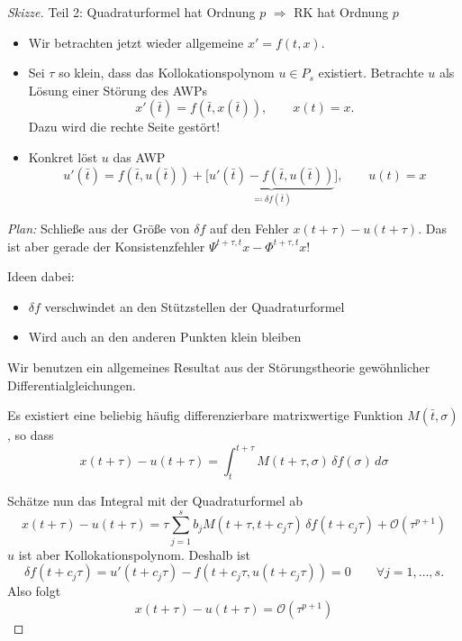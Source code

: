\begin{proof}[Skizze]
	Teil 2: Quadraturformel hat Ordnung $p$ $\Rightarrow$ RK hat Ordnung $p$
	\begin{itemize}
		\item  Wir betrachten jetzt wieder allgemeine $x' = f(t,x)$. 
		\item Sei $\tau $ so klein, dass das Kollokationspolynom $u\in P_s$ existiert. Betrachte $u$ als Lösung einer Störung des AWPs
		\begin{equation*}
			x'(\bar t) = f(\bar t, x(\bar t)),\qquad x(t) = x.
		\end{equation*}
		Dazu wird die rechte Seite gestört!
		\item Konkret löst $u$ das AWP
		\begin{equation*}
			u'(\bar t)
			= f( \bar t, u(\bar t) ) + \big[ \underbrace{u'(\bar t) - f(\bar t, u(\bar t))}_{\eqqcolon \delta f(\bar t)}   \big],
			\qquad
			u(t)=x
		\end{equation*}
	\end{itemize}
	\emph{Plan:} Schließe aus der Größe von $\delta f$ auf den Fehler $x(t+\tau) - u(t+\tau)$. Das ist aber gerade der Konsistenzfehler $\Psi^{t+\tau,t} x - \Phi^{t+\tau,t} x$!
	
	Ideen dabei: 
	\begin{itemize}
		\item $\delta f$ verschwindet an den Stützstellen der Quadraturformel
		\item Wird auch an den anderen Punkten klein bleiben
	\end{itemize}
	Wir benutzen ein allgemeines Resultat aus der Störungstheorie gewöhnlicher Differentialgleichungen.
	
	\begin{satz}
		Es existiert eine beliebig häufig differenzierbare matrixwertige Funktion $M(\bar t,\sigma)$, so dass 
		\begin{equation*}
		    x(t+\tau) - u(t+\tau) = \int_t^{t+\tau} M(t+\tau,\sigma)\,\delta f(\sigma)\,d\sigma
		\end{equation*}
	\end{satz}
	
	Schätze nun das Integral mit der Quadraturformel ab
	\begin{equation*}
		x(t+\tau) - u(t+\tau) = \tau \sum_{j=1}^s b_j M(t+\tau,t+c_j\tau)\,\delta f(t+c_j\tau) + \mathcal{O}(\tau^{p+1})
	\end{equation*}
	$u$ ist aber Kollokationspolynom. Deshalb ist
	\begin{equation*}
		\delta f(t+c_j\tau) = u'(t+c_j\tau) - f(t+c_j\tau,u(t+c_j\tau)) = 0 \qquad \forall j=1,\hdots,s.
	\end{equation*}
	Also folgt
	\begin{equation*}
		x(t+\tau) - u(t+\tau) = \mathcal{O}(\tau^{p+1})
	\end{equation*}
\end{proof}

